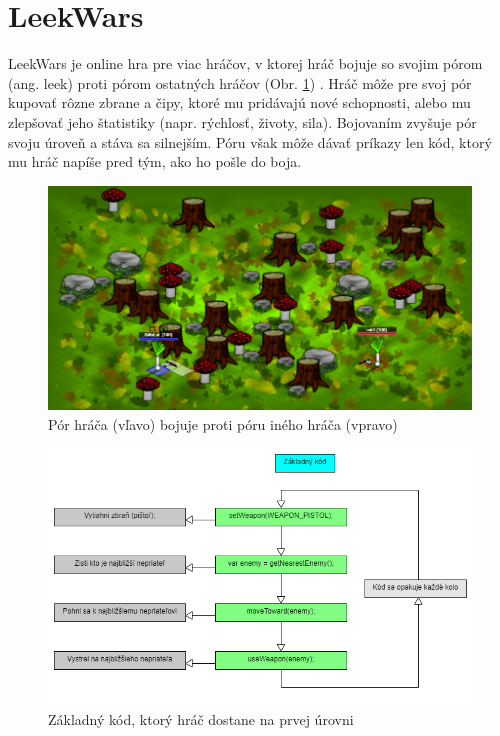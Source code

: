 \documentclass[slovak,a4paper,10pt]{article}
\begin{document}
\section{LeekWars}
LeekWars je online hra pre viac hráčov, v ktorej hráč bojuje so svojim pórom (ang. leek) proti pórom ostatných hráčov (Obr. \ref{fig:obr4}) \cite{combefis2016learning}. Hráč môže pre svoj pór kupovať rôzne zbrane a čipy, ktoré mu pridávajú nové schopnosti, alebo mu zlepšovať jeho štatistiky (napr. rýchlosť, životy, sila). Bojovaním zvyšuje pór svoju úroveň a stáva sa silnejším. Póru však môže dávať príkazy len kód, ktorý mu hráč napíše pred tým, ako ho pošle do boja.
\begin{figure}[h]
\includegraphics[scale=0.4]{leekwarsmain}
\centering
\caption{Pór hráča (vľavo) bojuje proti póru iného hráča (vpravo)}
\label{fig:obr4}
\end{figure}
\begin{figure}[h]
\includegraphics[scale=0.45]{leekwarscode}
\centering
\caption{Základný kód, ktorý hráč dostane na prvej úrovni}
\label{fig:obr5}
\end{figure}
\end{document}
